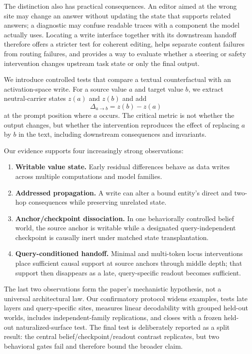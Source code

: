 \documentclass[10pt]{article}
\begin{document}
The distinction also has practical consequences. An editor aimed at the wrong
site may change an answer without updating the state that supports related
answers; a diagnostic may confuse readable traces with a component the model
actually uses. Locating a write interface together with its downstream handoff
therefore offers a stricter test for coherent editing, helps separate content
failures from routing failures, and provides a way to evaluate whether a
steering or safety intervention changes upstream task state or only the final
output.

We introduce controlled tests that compare a textual counterfactual with an
activation-space write. For a source value $a$ and target value $b$, we extract
neutral-carrier states $z(a)$ and $z(b)$ and add
\begin{equation}
    \Delta_{a\rightarrow b}=z(b)-z(a)
\end{equation}
at the prompt position where $a$ occurs. The critical metric is not whether the
output changes, but whether the intervention reproduces the effect of replacing
$a$ by $b$ in the text, including downstream consequences and invariants.

Our evidence supports four increasingly strong observations:
\begin{enumerate}[leftmargin=1.4em]
    \item \textbf{Writable value state.} Early residual differences behave as
    data writes across multiple computations and model families.
    \item \textbf{Addressed propagation.} A write can alter a bound entity's
    direct and two-hop consequences while preserving unrelated state.
    \item \textbf{Anchor/checkpoint dissociation.} In one behaviorally
    controlled belief world, the source anchor is writable while a designated
    query-independent checkpoint is causally inert under matched state
    transplantation.
    \item \textbf{Query-conditioned handoff.} Minimal and multi-token locus
    interventions place sufficient causal support at source anchors through
    middle depth; that support then disappears as a late, query-specific
    readout becomes sufficient.
\end{enumerate}

The last two observations form the paper's mechanistic hypothesis, not a universal
architectural law. Our confirmatory protocol widens examples, tests late layers
and query-specific sites, measures linear decodability with grouped held-out
worlds, includes independent-family replications, and closes with a frozen
held-out naturalized-surface test. The final test is deliberately reported as
a split result: the central belief/checkpoint/readout contrast replicates, but
two behavioral gates fail and therefore bound the broader claim.
\end{document}
